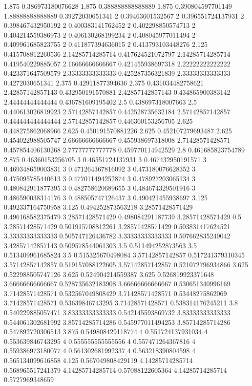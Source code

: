 {1.875 0.386973180076628
1.875 0.388888888888889
1.875 0.390804597701149
1.88888888888889 0.39272030651341
2 0.39463601532567
2 0.396551724137931
2 0.398467432950192
2 0.400383141762452
2 0.402298850574713
2 0.404214559386973
2 0.406130268199234
2 0.408045977011494
2 0.409961685823755
2 0.411877394636015
2 0.413793103448276
2.125 0.415708812260536
2.14285714285714 0.417624521072797
2.14285714285714 0.419540229885057
2.16666666666667 0.421455938697318
2.22222222222222 0.423371647509579
2.33333333333333 0.425287356321839
2.33333333333333 0.4272030651341
2.375 0.42911877394636
2.375 0.431034482758621
2.42857142857143 0.432950191570881
2.42857142857143 0.434865900383142
2.44444444444444 0.436781609195402
2.5 0.438697318007663
2.5 0.440613026819923
2.57142857142857 0.442528735632184
2.57142857142857 0.444444444444444
2.57142857142857 0.446360153256705
2.625 0.448275862068966
2.625 0.450191570881226
2.625 0.452107279693487
2.625 0.454022988505747
2.66666666666667 0.455938697318008
2.71428571428571 0.457854406130268
2.77777777777778 0.459770114942529
2.8 0.461685823754789
2.875 0.46360153256705
3 0.46551724137931
3 0.467432950191571
3 0.469348659003831
3 0.471264367816092
3 0.473180076628352
3 0.475095785440613
3 0.477011494252874
3 0.478927203065134
3 0.480842911877395
3 0.482758620689655
3 0.484674329501916
3 0.486590038314176
3 0.488505747126437
3 0.490421455938697
3.125 0.492337164750958
3.125 0.494252873563218
3.28571428571429 0.496168582375479
3.28571428571429 0.498084291187739
3.28571428571429 0.5
3.28571428571429 0.501915708812261
3.28571428571429 0.503831417624521
3.33333333333333 0.505747126436782
3.33333333333333 0.507662835249042
3.42857142857143 0.509578544061303
3.5 0.511494252873563
3.5 0.513409961685824
3.5 0.515325670498084
3.57142857142857 0.517241379310345
3.57142857142857 0.519157088122605
3.57142857142857 0.521072796934866
3.625 0.522988505747126
3.625 0.524904214559387
3.625 0.526819923371648
3.66666666666667 0.528735632183908
3.66666666666667 0.530651340996169
3.71428571428571 0.532567049808429
3.71428571428571 0.53448275862069
3.71428571428571 0.53639846743295
3.71428571428571 0.538314176245211
3.8 0.540229885057471
3.83333333333333 0.542145593869732
3.83333333333333 0.544061302681992
3.85714285714286 0.545977011494253
3.85714285714286 0.547892720306513
3.875 0.549808429118774
4 0.551724137931034
4 0.553639846743295
4 0.555555555555556
4 0.557471264367816
4 0.559386973180077
4 0.561302681992337
4 0.563218390804598
4 0.565134099616858
4.125 0.567049808429119
4.14285714285714 0.568965517241379
4.14285714285714 0.57088122605364
4.14285714285714 0.5727969348659
}

